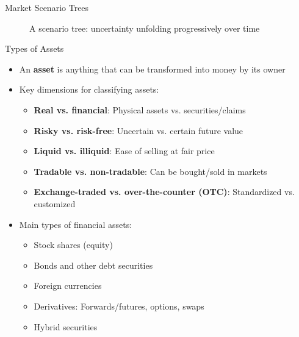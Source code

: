 \documentclass[10pt]{beamer}
\begin{document}
\begin{frame}{Market Scenario Trees}
\begin{figure}
  \caption{A scenario tree: uncertainty unfolding progressively over time}
\end{figure}
\end{frame}


\begin{frame}{Types of Assets}
  \begin{itemize}[<+->]
    \item An \textbf{asset} is anything that can be transformed into money by its owner
    \item Key dimensions for classifying assets:
      \begin{itemize}
        \item \textbf{Real vs. financial}: Physical assets vs. securities/claims
        \item \textbf{Risky vs. risk-free}: Uncertain vs. certain future value
        \item \textbf{Liquid vs. illiquid}: Ease of selling at fair price
        \item \textbf{Tradable vs. non-tradable}: Can be bought/sold in markets
        \item \textbf{Exchange-traded vs. over-the-counter (OTC)}: Standardized vs. customized
      \end{itemize}
    \item Main types of financial assets:
      \begin{itemize}
        \item Stock shares (equity)
        \item Bonds and other debt securities
        \item Foreign currencies
        \item Derivatives: Forwards/futures, options, swaps
        \item Hybrid securities
      \end{itemize}
  \end{itemize}
\end{frame}
\end{document}
